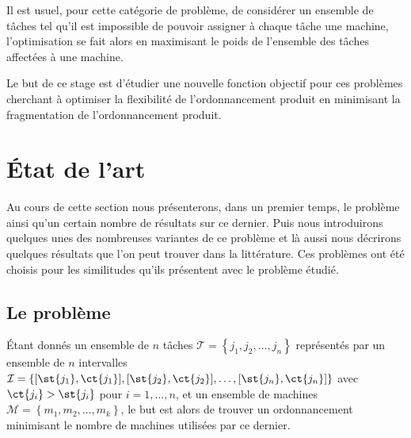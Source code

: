 \documentclass[a4paper,11pt]{report}
\begin{document}

Il est usuel, pour cette catégorie de problème,  de considérer un ensemble de tâches tel qu'il est
impossible de pouvoir assigner à chaque tâche une machine, l'optimisation se fait alors en
maximisant le poids de l'ensemble des tâches affectées à une machine. 

Le but de ce stage est d'étudier une nouvelle fonction objectif pour ces problèmes cherchant à
optimiser la flexibilité de l'ordonnancement produit en minimisant la fragmentation de
l'ordonnancement produit.


\newpage
\chapter{État de l'art}

Au cours de cette section nous présenterons, dans un premier temps, le problème \bisched{} ainsi qu'un
certain nombre de résultats sur ce dernier. Puis nous introduirons quelques unes des nombreuses
variantes de ce problème et là aussi nous décrirons quelques résultats que l'on peut trouver dans la
littérature. Ces problèmes ont été choisis pour les similitudes qu'ils présentent avec le problème
étudié.

\section{Le problème \bisched{}}

Étant donnés un ensemble de $n$ tâches $\mathcal{T} = \left\{
j_1, j_2, \dots, j_n \right\}$ représentés par un ensemble de $n$ intervalles $\mathcal{I} = \{
[ \st{j_1}, \ct{j_1} ], [ \st{j_2}, \ct{j_2} ], \dots, [ \st{j_n},
\ct{j_n} ] \}$ avec $\ct{j_i} > \st{j_i}$ pour $i = 1, \dots, n$, et un ensemble de
machines $\mathcal{M} = \left\{ m_1, m_2, \dots, m_k \right\}$, le but est alors de trouver un
ordonnancement minimisant le nombre de machines utilisées par ce dernier.
\end{document}
